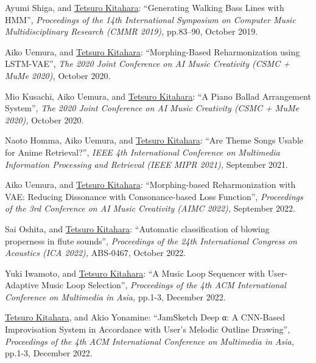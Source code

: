 \begin{Enumerate}
\item 
Ayumi Shiga, 
and 
\underline{Tetsuro Kitahara}: 
    ``Generating Walking Bass Lines with HMM'', 
    {\it Proceedings of the 14th International Symposium on Computer Music Multidisciplinary Research (CMMR 2019),
    } pp.83--90, October 2019. 

\item 
Aiko Uemura, 
and 
\underline{Tetsuro Kitahara}: 
    ``Morphing-Based Reharmonization using LSTM-VAE'', 
    {\it The 2020 Joint Conference on AI Music Creativity (CSMC + MuMe 2020),
    } October 2020. 

\item 
Mio Kusachi, 
Aiko Uemura, 
and 
\underline{Tetsuro Kitahara}: 
    ``A Piano Ballad Arrangement System'', 
    {\it The 2020 Joint Conference on AI Music Creativity (CSMC + MuMe 2020),
    } October 2020. 

\item 
Naoto Homma, 
Aiko Uemura, 
and 
\underline{Tetsuro Kitahara}: 
    ``Are Theme Songs Usable for Anime Retrieval?'', 
    {\it IEEE 4th International Conference on Multimedia Information Processing and Retrieval (IEEE MIPR 2021),
    } September 2021. 

\item 
Aiko Uemura, 
and 
\underline{Tetsuro Kitahara}: 
    ``Morphing-based Reharmonization with VAE: Reducing Dissonance with Consonance-based Loss Function'', 
    {\it Proceedings of the 3rd Conference on AI Music Creativity (AIMC 2022),
    } September 2022. 

\item 
Sai Oshita, 
and 
\underline{Tetsuro Kitahara}: 
    ``Automatic classification of blowing properness in flute sounds'', 
    {\it Proceedings of the 24th International Congress on Acoustics (ICA 2022),
    } ABS-0467, October 2022. 

\item 
Yuki Iwamoto, 
and 
\underline{Tetsuro Kitahara}: 
    ``A Music Loop Sequencer with User-Adaptive Music Loop Selection'', 
    {\it Proceedings of the 4th ACM International Conference on Multimedia in Asia,
    } pp.1-3, December 2022. 

\item 
\underline{Tetsuro Kitahara}, 
and 
Akio Yonamine: 
    ``JamSketch Deep α: A CNN-Based Improvisation System in Accordance with User's Melodic Outline Drawing'', 
    {\it Proceedings of the 4th ACM International Conference on Multimedia in Asia,
    } pp.1-3, December 2022. 

\end{Enumerate}

